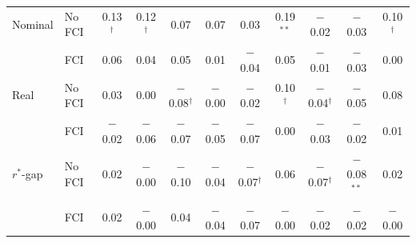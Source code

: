 \begin{tabular}{llccccccccc}
Nominal & No FCI & 0.13$^{\dagger}$ & 0.12$^{\dagger}$ & 0.07 & 0.07 & 0.03 & 0.19$^{**}$ & $-$0.02 & $-$0.03 & 0.10$^{\dagger}$ \\
 & FCI & 0.06 & 0.04 & 0.05 & 0.01 & $-$0.04 & 0.05 & $-$0.01 & $-$0.03 & 0.00 \\
Real & No FCI & 0.03 & 0.00 & $-$0.08$^{\dagger}$ & $-$0.00 & $-$0.02 & 0.10$^{\dagger}$ & $-$0.04$^{\dagger}$ & $-$0.05 & 0.08 \\
 & FCI & $-$0.02 & $-$0.06 & $-$0.07 & $-$0.05 & $-$0.07 & 0.00 & $-$0.03 & $-$0.02 & 0.01 \\
$r^*$-gap & No FCI & 0.02 & $-$0.00 & $-$0.10 & $-$0.04 & $-$0.07$^{\dagger}$ & 0.06 & $-$0.07$^{\dagger}$ & $-$0.08$^{**}$ & 0.02 \\
 & FCI & 0.02 & $-$0.00 & 0.04 & $-$0.04 & $-$0.07 & $-$0.00 & $-$0.02 & $-$0.02 & $-$0.00 \\
\bottomrule
\end{tabular}
